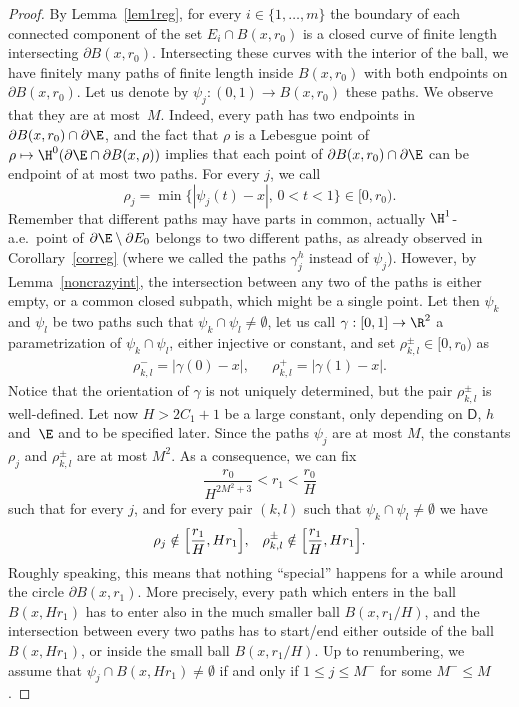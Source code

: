 \begin{proof}
By Lemma~\ref{lem1reg}, for every $i\in\{1,\dots,m\}$ the boundary of each connected component of the set $E_i\cap B(x,r_0)$ is a closed curve of finite length intersecting $\partial B(x,r_0)$. Intersecting these curves with the interior of the ball, we have finitely many paths of finite length inside $B(x,r_0)$ with both endpoints on $\partial B(x,r_0)$. Let us denote by $\psi_j:(0,1)\to B(x,r_0)$ these paths. We observe that they are at most~$M$. Indeed, every path has two endpoints in $\partial B(x,r_0)\cap \partial\E$, and the fact that $\rho$ is a Lebesgue point of $\rho\mapsto \H^0(\partial\E\cap \partial B(x,\rho))$ implies that each point of $\partial B(x,r_0)\cap \partial\E$ can be endpoint of at most two paths. For every $j$, we call \Changel
\[
\rho_j = \min \big\{|\psi_j(t)-x|,\, 0<t< 1\big\}\in [0,r_0).
\]
Remember that different paths may have parts in common, actually $\H^1$-a.e.\ point of $\partial\E\setminus\partial E_0$ belongs to two different paths, as already observed in Corollary~\ref{correg} (where we called the paths $\gamma_j^h$ instead of $\psi_j$). However, by Lemma~\ref{noncrazyint}, the intersection between any two of the paths is either empty, or a common closed subpath, which might be a single point. Let then $\psi_k$ and $\psi_l$ be two paths such that $\psi_k\cap\psi_l\neq \emptyset$, let us call $\gamma:[0,1]\to\R^2$ a parametrization of $\psi_k\cap\psi_l$, either injective or constant, and set $\rho^\pm_{k,l}\in [0,r_0)$ as
\begin{align*}
\rho^-_{k,l} = |\gamma(0)-x|, &&
\rho^+_{k,l} =|\gamma(1)-x|.
\end{align*}
Notice that the orientation of $\gamma$ is not uniquely determined, but the pair $\rho^\pm_{k,l}$ is well-defined. Let now $H>2C_1+1$ be a large constant, only depending on $\mathsf{D}$, $h$ and~$\E$ and to be specified later. Since the paths $\psi_j$ are at most $M$, the constants $\rho_j$ and $\rho_{k,l}^\pm$ are at most $M^2$. As a consequence, we can fix
\begin{equation}\label{bigr1}
\frac{r_0}{H^{2M^2+3}} < r_1 < \frac {r_0}H
\end{equation}
such that for every $j$, and for every pair $(k,l)$ such that $\psi_k\cap\psi_l\neq\emptyset$ we have
\begin{align}\label{nothap}
\rho_j \notin \Bigl[ \frac{r_1}H, Hr_1\Bigr], &&
\rho_{k,l}^\pm \notin \Bigl[ \frac{r_1}H,H r_1\Bigr].
\end{align}
Roughly speaking, this means that nothing ``special'' happens for a while around the circle $\partial B(x,r_1)$. More precisely, every path which enters in the ball $B(x,Hr_1)$ has to enter also in the much smaller ball $B(x,r_1/H)$, and the intersection between every two paths has to start/end either outside of the ball $B(x,Hr_1)$, or inside the small ball $B(x,r_1/H)$. Up to renumbering, we assume that $\psi_j\cap B(x,Hr_1)\neq \emptyset$ if and only if $1\leq j \leq M^-$ for some $M^-\leq M$. \Changelback


\end{proof}
